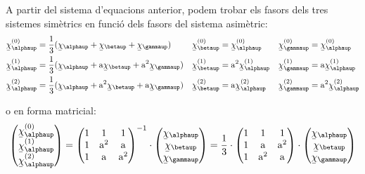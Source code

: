 A partir del sistema d'equacions anterior, podem trobar els fasors
dels tres sistemes sim\`{e}trics en funci\'{o} dels fasors del sistema
asim\`{e}tric:
\begin{subequations}
\begin{align}
   \cmplx{\chi}_\alphaup\ap{(0)} &= \frac{1}{3} (\cmplx{\chi}_\alphaup + \cmplx{\chi}_\betaup +
   \cmplx{\chi}_\gammaup) & \cmplx{\chi}_\betaup\ap{(0)} &= \cmplx{\chi}_\alphaup\ap{(0)} &
   \cmplx{\chi}_\gammaup\ap{(0)} &= \cmplx{\chi}_\alphaup\ap{(0)}
   \label{eq:c_sim_c2}\\
   \cmplx{\chi}_\alphaup\ap{(1)} &= \frac{1}{3} (\cmplx{\chi}_\alphaup + \au \cmplx{\chi}_\betaup +
   \au^2 \cmplx{\chi}_\gammaup) & \cmplx{\chi}_\betaup\ap{(1)} &= \au^2 \cmplx{\chi}_\alphaup\ap{(1)} &
   \cmplx{\chi}_\gammaup\ap{(1)} &= \au \cmplx{\chi}_\alphaup\ap{(1)} \label{eq:c_sim_a2} \\
   \cmplx{\chi}_\alphaup\ap{(2)} &= \frac{1}{3} (\cmplx{\chi}_\alphaup + \au^2 \cmplx{\chi}_\betaup +
   \au \cmplx{\chi}_\gammaup) & \cmplx{\chi}_\betaup\ap{(2)} &= \au \cmplx{\chi}_\alphaup\ap{(2)} &
   \cmplx{\chi}_\gammaup\ap{(2)} &= \au^2 \cmplx{\chi}_\alphaup\ap{(2)} \label{eq:c_sim_b2}
\end{align}
\end{subequations}

o en forma matricial:
\begin{equation}
   \begin{pmatrix}
     \cmplx{\chi}_\alphaup\ap{(0)} \\
     \cmplx{\chi}_\alphaup\ap{(1)} \\
     \cmplx{\chi}_\alphaup\ap{(2)}
   \end{pmatrix} =
   \begin{pmatrix}
     1 & 1 & 1 \\
     1 & \au^2 & \au\\
     1 & \au & \au^2
   \end{pmatrix}^{-1} \cdot
   \begin{pmatrix}
     \cmplx{\chi}_\alphaup \\
     \cmplx{\chi}_\betaup \\
     \cmplx{\chi}_\gammaup
   \end{pmatrix} =  \frac{1}{3} \cdot
   \begin{pmatrix}
     1 & 1 & 1 \\
     1 & \au & \au^2 \\
     1 & \au^2 & \au
   \end{pmatrix} \cdot
   \begin{pmatrix}
     \cmplx{\chi}_\alphaup \\
     \cmplx{\chi}_\betaup \\
     \cmplx{\chi}_\gammaup
   \end{pmatrix}
\end{equation}

